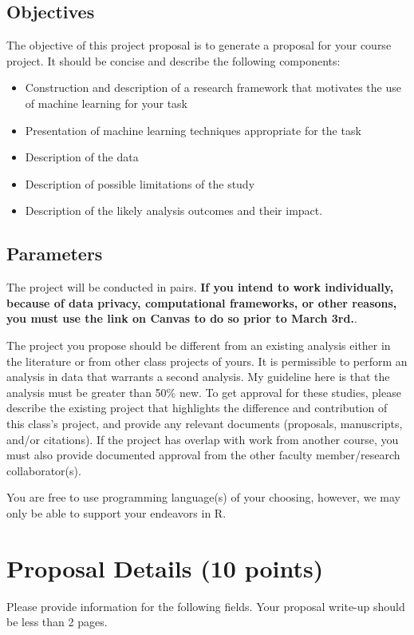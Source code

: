 \documentclass[twoside,11pt]{article}
\begin{document}
\subsection{Objectives}
The objective of this project proposal is to generate a proposal for your course project. It should be concise and describe the following components:
\begin{itemize}
\item Construction and description of a research framework that motivates the use of machine learning for your task
\item Presentation of machine learning techniques appropriate for the task
\item Description of the data
\item Description of possible limitations of the study
\item Description of the likely analysis outcomes and their impact.
\end{itemize}

\subsection{Parameters}
The project will be conducted in pairs. \textbf{If you intend to work individually, because of data privacy, computational frameworks, or other reasons, you must use the link on Canvas to do so prior to March 3rd.}.

The project you propose should be different from an existing analysis either in the literature or from other class projects of yours. It is permissible to perform an analysis in data that warrants a second analysis. My guideline here is that the analysis must be greater than 50\% new. To get approval for these studies, please describe the existing project that highlights the difference and contribution of this class's project, and provide any relevant documents (proposals, manuscripts, and/or citations). If the project has overlap with work from another course, you must also provide documented approval from the other faculty member/research collaborator(s). 

You are free to use programming language(s) of your choosing, however, we may only be able to support your endeavors in R.

\section{Proposal Details (10 points)} \label{details}
Please provide information for the following fields. Your proposal write-up should be less than 2 pages.
\end{document}
